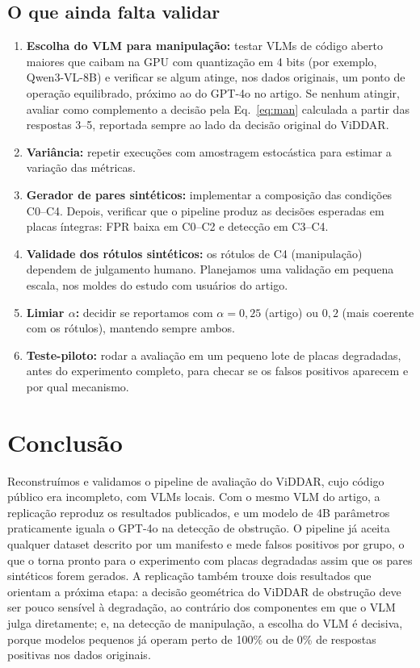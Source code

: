 \documentclass[journal,onecolumn]{IEEEtran}
\begin{document}
\subsection{O que ainda falta validar}
\begin{enumerate}
\item \textbf{Escolha do VLM para manipulação:} testar VLMs de código aberto maiores que caibam na GPU
  com quantização em 4 bits (por exemplo, Qwen3-VL-8B) e verificar se algum atinge, nos dados
  originais, um ponto de operação equilibrado, próximo ao do GPT-4o no artigo. Se nenhum atingir,
  avaliar como complemento a decisão pela Eq.~\eqref{eq:man} calculada a partir das respostas 3--5,
  reportada sempre ao lado da decisão original do ViDDAR.
\item \textbf{Variância:} repetir execuções com amostragem estocástica para estimar a variação das
  métricas.
\item \textbf{Gerador de pares sintéticos:} implementar a composição das condições C0--C4. Depois,
  verificar que o pipeline produz as decisões esperadas em placas íntegras: FPR baixa em C0--C2 e
  detecção em C3--C4.
\item \textbf{Validade dos rótulos sintéticos:} os rótulos de C4 (manipulação) dependem de julgamento
  humano. Planejamos uma validação em pequena escala, nos moldes do estudo com usuários do artigo.
\item \textbf{Limiar $\alpha$:} decidir se reportamos com $\alpha=0{,}25$ (artigo) ou $0{,}2$ (mais
  coerente com os rótulos), mantendo sempre ambos.
\item \textbf{Teste-piloto:} rodar a avaliação em um pequeno lote de placas degradadas, antes do
  experimento completo, para checar se os falsos positivos aparecem e por qual mecanismo.
\end{enumerate}

\section{Conclusão}
Reconstruímos e validamos o pipeline de avaliação do ViDDAR, cujo código público era incompleto, com
VLMs locais. Com o mesmo VLM do artigo, a replicação reproduz os resultados publicados, e um modelo de
4B parâmetros praticamente iguala o GPT-4o na detecção de obstrução. O pipeline já aceita qualquer
dataset descrito por um manifesto e mede falsos positivos por grupo, o que o torna pronto para o
experimento com placas degradadas assim que os pares sintéticos forem gerados. A replicação também
trouxe dois resultados que orientam a próxima etapa: a decisão geométrica do ViDDAR de obstrução deve
ser pouco sensível à degradação, ao contrário dos componentes em que o VLM julga diretamente; e, na
detecção de manipulação, a escolha do VLM é decisiva, porque modelos pequenos já operam perto de 100\%
ou de 0\% de respostas positivas nos dados originais.
\end{document}
